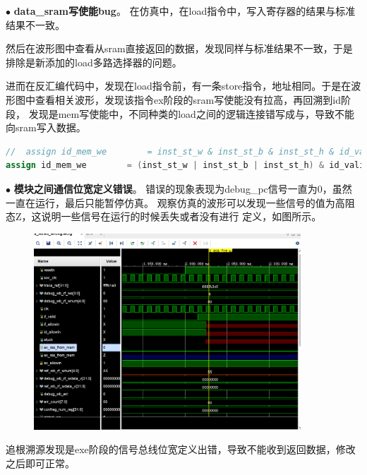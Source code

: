 \documentclass[11pt]{article}
\begin{document}
\noindent
$\bullet$
\textbf{data_sram写使能bug}。
在仿真中，在load指令中，写入寄存器的结果与标准结果不一致。

然后在波形图中查看从sram直接返回的数据，发现同样与标准结果不一致，于是排除是新添加的load多路选择器的问题。

进而在反汇编代码中，发现在load指令前，有一条store指令，地址相同。于是在波形图中查看相关波形，发现该指令ex阶段的sram写使能没有拉高，再回溯到id阶段，
发现是mem写使能中，不同种类的load之间的逻辑连接错写成与，导致不能向sram写入数据。

\begin{lstlisting}[language=verilog]
//  assign id_mem_we        = inst_st_w & inst_st_b & inst_st_h & id_valid;  
assign id_mem_we        = (inst_st_w | inst_st_b | inst_st_h) & id_valid;  
\end{lstlisting}
\vspace{1ex}

\noindent
$\bullet$
\textbf{模块之间通信位宽定义错误}。
错误的现象表现为debug_pc信号一直为0，虽然一直在运行，最后只能暂停仿真。
观察仿真的波形可以发现一些信号的值为高阻态Z，这说明一些信号在运行的时候丢失或者没有进行
定义，如图所示。
\begin{figure}[h]
  \centering
  \includegraphics[width=10cm]{fig/1.png}
\end{figure}
追根溯源发现是exe阶段的信号总线位宽定义出错，导致不能收到返回数据，修改之后即可正常。

\vspace{1ex}
\end{document}
